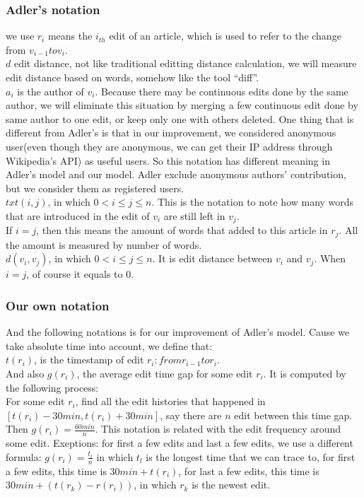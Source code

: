 \documentclass[preprint,review,12pt]{elsarticle}
\begin{document}
\subsubsection{Adler's notation}
we use $r_i$ means the $i_{th}$ edit of an article, which is used to refer to
the change from $v_{i-1} to v_i$.\\
$d$ edit distance, not like traditional editting distance calculation, we will
measure edit distance based on words, somehow like the tool ``diff''.\\
$a_i$ is the author of $v_i$. Because there may be continuous edits done by the
same author, we will eliminate this situation by merging a few continuous edit
done by same author to one edit, or keep only one with others deleted. One thing
that is different from Adler's is that in our improvement, we considered
anonymous user(even though they are anonymous, we can get their IP address
through Wikipedia's API) as useful users. So this notation has different meaning
in Adler's model and our model. Adler exclude anonymous authors' contribution,
but we consider them as registered users.\\
$txt(i,j)$, in which $0 < i \leq j \leq n$. This is the notation to note how
many words that are introduced in the edit of $v_i$ are still left in $v_j$.\\
If $i = j$, then this means the amount of words that added to this article in
$r_j$. All the amount is measured by number of words.\\
$d(v_i,v_j)$, in which $0 < i \leq j \leq n$. It is edit distance between $v_i$
and $v_j$. When $i=j$, of course it equals to 0.\\
\subsubsection{Our own notation}
And the following notations is for our improvement of Adler's model. Cause we
take absolute time into account, we define that:\\
$t(r_i)$, is the timestamp of edit $r_i:from r_{i-1} to r_i$.\\
And also $g(r_i)$, the average edit time gap for some edit $r_i$. It is computed
by the following process:\\
For some edit $r_i$, find all the edit histories that happened in $[
  t(r_i)-30min, t(r_i)+30min]$, say there are $n$ edit between this time gap.
Then $g(r_i) = \frac{60min}{n}$. This notation is related with the edit
frequency around some edit. Exeptions: for first a few edits and last a few
edits, we use a different formula: $g(r_i) = \frac{t_l}{n}$ in which $t_l$ is
the longest time that we can trace to, for first a few edits, this time is
$30min+t(r_i)$, for last a few edits, this time is $30min+(t(r_k)-r(r_i))$, in
which $r_k$ is the newest edit.
\end{document}
